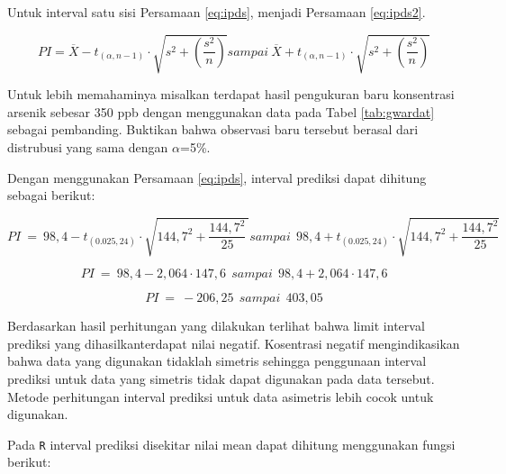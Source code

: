 \documentclass[]{book}
\begin{document}
Untuk interval satu sisi Persamaan \eqref{eq:ipds}, menjadi Persamaan
\eqref{eq:ipds2}.

\begin{equation}
  PI=\overline{X}-t_{\left(\alpha,n-1\right)}\cdot\sqrt{s^2+\left(\frac{s^2}{n}\right)}sampai\ \overline{X}+t_{\left(\alpha,n-1\right)}\cdot\sqrt{s^2+\left(\frac{s^2}{n}\right)}
  \label{eq:ipds2}
\end{equation}

Untuk lebih memahaminya misalkan terdapat hasil pengukuran baru
konsentrasi arsenik sebesar 350 ppb dengan menggunakan data pada Tabel
\ref{tab:gwardat} sebagai pembanding. Buktikan bahwa observasi baru
tersebut berasal dari distrubusi yang sama dengan \(\alpha\)=5\%.

Dengan menggunakan Persamaan \eqref{eq:ipds}, interval prediksi dapat
dihitung sebagai berikut:

\[
PI\ =\ 98,4-t_{\left(0.025,24\right)}\cdot\sqrt{144,7^2+\frac{144,7^2}{25}\ }sampai\ \ 98,4+t_{\left(0.025,24\right)}\cdot\sqrt{144,7^2+\frac{144,7^2}{25}}
\]

\[
PI\ =\ 98,4-2,064\cdot147,6\ \ sampai\ \ 98,4+2,064\cdot147,6
\]

\[
PI\ =\ -206,25\ \ sampai\ \ 403,05
\]

Berdasarkan hasil perhitungan yang dilakukan terlihat bahwa limit
interval prediksi yang dihasilkanterdapat nilai negatif. Kosentrasi
negatif mengindikasikan bahwa data yang digunakan tidaklah simetris
sehingga penggunaan interval prediksi untuk data yang simetris tidak
dapat digunakan pada data tersebut. Metode perhitungan interval prediksi
untuk data asimetris lebih cocok untuk digunakan.

Pada \texttt{R} interval prediksi disekitar nilai mean dapat dihitung
menggunakan fungsi berikut:
\end{document}

